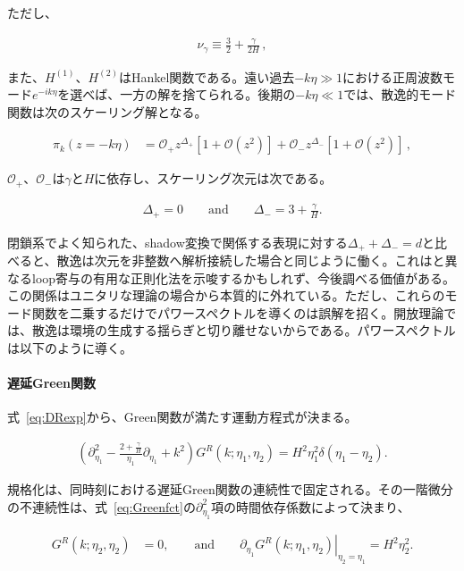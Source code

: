\documentclass[a4paper,11pt]{ltjsarticle}
\numberwithin{equation}{section}
\newcommand{\ee}{e}
\newcommand{\Eq}[1]{Eq.~(\ref{#1})}
\renewcommand{\Eq}[1]{式~\eqref{#1}}
\begin{document}
ただし、

\begin{align}
    \nu_\gamma \equiv \frac{3}{2}+ \frac{\gamma}{2H}\,,
\end{align}

また、$H^{(1)}$、$H^{(2)}$はHankel関数である。遠い過去$-k\eta\gg1$における正周波数モード$\ee^{-ik\eta}$を選べば、一方の解を捨てられる。後期の$-k\eta\ll1$では、散逸的モード関数は次のスケーリング解となる。

\begin{align}
\pi_k(z = - k \eta) &=  \mathcal{O}_+  z^{\Delta_+}  \left[1 +\mathcal{O}(z^2) \right] + \mathcal{O}_- z^{\Delta_-}  \left[1 +\mathcal{O}(z^2) \right]\,,
\end{align}

$\mathcal O_+$、$\mathcal O_-$は$\gamma$と$H$に依存し、スケーリング次元は次である。

\begin{align}
\Delta_+ = 0 \qquad \mathrm{and} \qquad \Delta_- = 3 + \frac{\gamma}{H}.
\end{align}

閉鎖系でよく知られた、shadow変換で関係する表現に対する$\Delta_++\Delta_-=d$と比べると、散逸は次元を非整数へ解析接続した場合と同じように働く。これは\cite{Senatore:2009cf,Melville:2021lst,Lee:2023jby}と異なるloop寄与の有用な正則化法を示唆するかもしれず、今後調べる価値がある。この関係はユニタリな理論の場合から本質的に外れている。ただし、これらのモード関数を二乗するだけでパワースペクトルを導くのは誤解を招く。開放理論では、散逸は環境の生成する揺らぎと切り離せないからである\cite{breuerTheoryOpenQuantum2002}。パワースペクトルは以下のように導く。

\paragraph{遅延Green関数} \Eq{eq:DRexp}から、Green関数が満たす運動方程式が決まる。

\begin{align}\label{eq:Greenfct}
\left(\partial_{\eta_1}^2 - \frac{2 + \frac{\gamma}{H}}{\eta_1}\partial_{\eta_1} + k^2  \right) G^{R} (k; \eta_1, \eta_2) = H^2 \eta_1^2 \delta(\eta_1-\eta_2).
\end{align}

規格化は、同時刻における遅延Green関数の連続性で固定される。その一階微分の不連続性は、\Eq{eq:Greenfct}の$\partial_{\eta_1}^2$項の時間依存係数によって決まり、

\begin{align}
G^R(k; \eta_2,\eta_2) &= 0, \qquad \mathrm{and} \qquad
\left. \partial_{\eta_1}G^R(k; \eta_1,\eta_2) \right|_{\eta_2 = \eta_1} = H^2 \eta^2_2.
\end{align}
\end{document}
